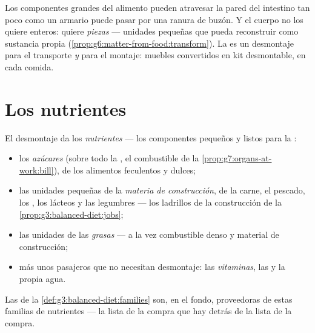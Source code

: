 \begin{remark}\label{rem:g7:digestion-and-nutrients:why}
Los componentes grandes del alimento pueden atravesar la pared del
intestino tan poco como un armario puede pasar por una ranura de
buzón. Y el cuerpo no los quiere enteros: quiere \emph{piezas} ---
unidades pequeñas que pueda reconstruir como sustancia propia
(\cref{prop:g6:matter-from-food:transform}). La  es un
desmontaje para el transporte \emph{y} para el montaje: muebles
convertidos en kit desmontable, en cada comida.
\end{remark}

\section{Los nutrientes}

\begin{definition}\label{def:g7:digestion-and-nutrients:families}
El desmontaje da los \emph{nutrientes} --- los
componentes pequeños y listos para la :
\begin{itemize}
  \item los \emph{azúcares} (sobre todo la , el combustible de
        la \cref{prop:g7:organs-at-work:bill}), de los alimentos
        feculentos y dulces;
  \item las unidades pequeñas de la \emph{materia de construcción}, de
        la carne, el pescado, los , los lácteos y las legumbres
        --- los ladrillos de la construcción de la
        \cref{prop:g3:balanced-diet:jobs};
  \item las unidades de las \emph{grasas} --- a la vez combustible
        denso y material de construcción;
  \item más unos pasajeros que no necesitan desmontaje: las
        \emph{vitaminas}, las \emph{} y la propia agua.
\end{itemize}
Las  de la \cref{def:g3:balanced-diet:families}
son, en el fondo, proveedoras de estas familias de nutrientes --- la
lista de la compra que hay detrás de la lista de la compra.
\end{definition}

